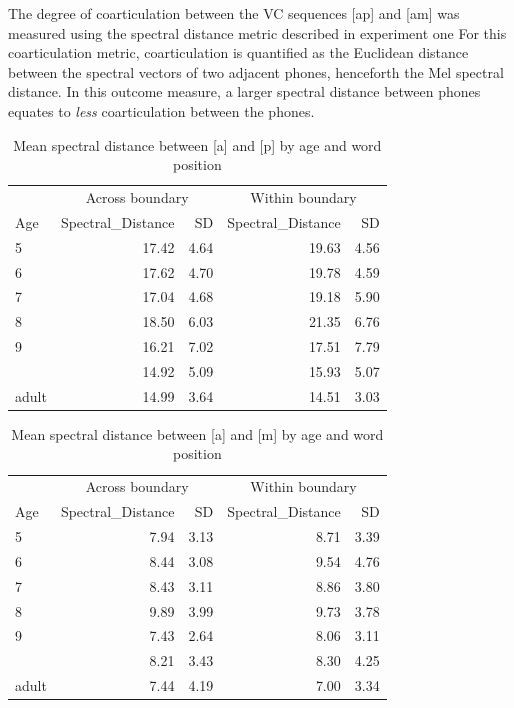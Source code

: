 \documentclass[
]{article}
\begin{document}
The degree of coarticulation between the VC sequences {[}ap{]} and {[}am{]} was measured using the spectral distance metric described in experiment one For this coarticulation metric, coarticulation is quantified as the Euclidean distance between the spectral vectors of two adjacent phones, henceforth the Mel spectral distance. In this outcome measure, a larger spectral distance between phones equates to \emph{less} coarticulation between the phones.

\begin{table}

\caption{\label{tab:ap-coartic-tbl}Mean spectral distance between [a] and [p] by age and word position}
\centering
\begin{tabular}[t]{lrrrr}
\toprule
\multicolumn{1}{c}{ } & \multicolumn{2}{c}{Across boundary} & \multicolumn{2}{c}{Within boundary} \\
\cmidrule(l{3pt}r{3pt}){2-3} \cmidrule(l{3pt}r{3pt}){4-5}
Age & Spectral\_Distance  & SD  & Spectral\_Distance & SD\\
\midrule
5 & 17.42 & 4.64 & 19.63 & 4.56\\
6 & 17.62 & 4.70 & 19.78 & 4.59\\
7 & 17.04 & 4.68 & 19.18 & 5.90\\
8 & 18.50 & 6.03 & 21.35 & 6.76\\
9 & 16.21 & 7.02 & 17.51 & 7.79\\
\addlinespace
10 & 14.92 & 5.09 & 15.93 & 5.07\\
adult & 14.99 & 3.64 & 14.51 & 3.03\\
\bottomrule
\end{tabular}
\end{table}

\begin{table}

\caption{\label{tab:am-coartic-tbl}Mean spectral distance between [a] and [m] by age and word position}
\centering
\begin{tabular}[t]{lrrrr}
\toprule
\multicolumn{1}{c}{ } & \multicolumn{2}{c}{Across boundary} & \multicolumn{2}{c}{Within boundary} \\
\cmidrule(l{3pt}r{3pt}){2-3} \cmidrule(l{3pt}r{3pt}){4-5}
Age & Spectral\_Distance  & SD  & Spectral\_Distance & SD\\
\midrule
5 & 7.94 & 3.13 & 8.71 & 3.39\\
6 & 8.44 & 3.08 & 9.54 & 4.76\\
7 & 8.43 & 3.11 & 8.86 & 3.80\\
8 & 9.89 & 3.99 & 9.73 & 3.78\\
9 & 7.43 & 2.64 & 8.06 & 3.11\\
\addlinespace
10 & 8.21 & 3.43 & 8.30 & 4.25\\
adult & 7.44 & 4.19 & 7.00 & 3.34\\
\bottomrule
\end{tabular}
\end{table}
\end{document}
